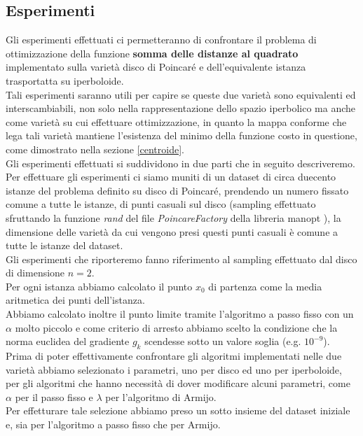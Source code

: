 \documentclass[a4paper, 12pt]{article}
\begin{document}
\subsection{Esperimenti}
Gli esperimenti effettuati ci permetteranno di confrontare il problema di ottimizzazione della funzione \textbf{somma delle distanze al quadrato} implementato sulla varietà disco di Poincaré e dell'equivalente istanza trasportatta su iperboloide.\\
Tali esperimenti saranno utili per capire se queste due varietà sono equivalenti ed interscambiabili, non solo nella rappresentazione dello spazio iperbolico ma anche come varietà su cui effettuare ottimizzazione, in quanto la mappa conforme che lega tali varietà mantiene l'esistenza del minimo della funzione costo in questione, come dimostrato nella sezione \ref{centroide}.\\
Gli esperimenti effettuati si suddividono in due parti che in seguito descriveremo.\\
Per effettuare gli esperimenti ci siamo muniti di un dataset di circa duecento istanze del problema definito su disco di Poincaré, prendendo un numero fissato comune a tutte le istanze, di punti casuali sul disco (sampling effettuato sfruttando la funzione \textit{rand} del file \textit{PoincareFactory} della libreria manopt \cite{ManOpt}), la dimensione delle varietà da cui vengono presi questi punti casuali è comune a tutte le istanze del dataset.\\
Gli esperimenti che riporteremo fanno riferimento al sampling effettuato dal disco di dimensione $n=2$.\\
Per ogni istanza abbiamo calcolato il punto $x_0$ di partenza come la media aritmetica dei punti dell'istanza.\\ Abbiamo calcolato inoltre il punto limite tramite l'algoritmo a passo fisso con un $\alpha$ molto piccolo e come criterio di arresto abbiamo scelto la condizione che la norma euclidea del gradiente $g_k$ scendesse sotto un valore soglia (e.g. $10^{-9}$).\\
Prima di poter effettivamente confrontare gli algoritmi implementati nelle due varietà abbiamo selezionato i parametri, uno per disco ed uno per iperboloide, per gli algoritmi che hanno necessità di dover modificare alcuni parametri, come $\alpha$ per il passo fisso e $\lambda$ per l'algoritmo di Armijo.\\
Per effetturare tale selezione abbiamo preso un sotto insieme del dataset iniziale e, sia per l'algoritmo a passo fisso che per Armijo.\\
\end{document}
